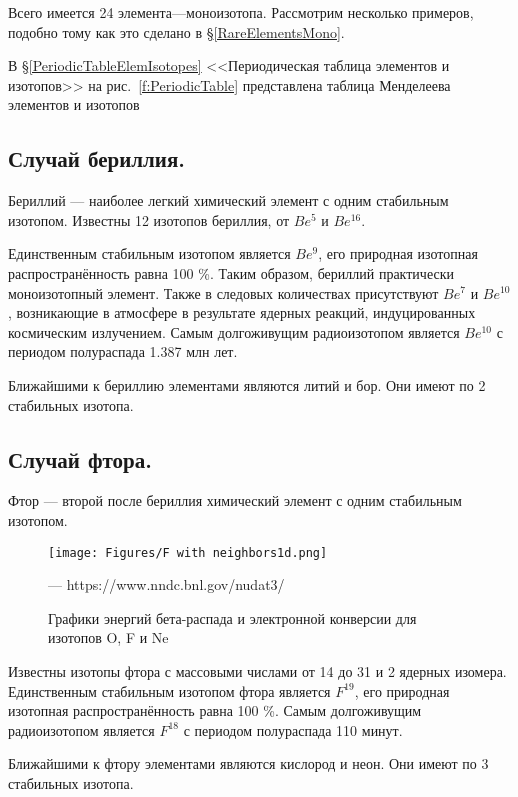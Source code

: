\documentclass[a5paper,openany]{book}
\begin{document}
Всего имеется 24 элемента---моноизотопа. Рассмотрим несколько примеров, подобно тому как это сделано в \S\ref{RareElementsMono}. 

В \S\ref{PeriodicTableElemIsotopes} <<Периодическая таблица элементов и изотопов>>
на рис.~\ref{f:PeriodicTable} представлена таблица Менделеева элементов и изотопов \cite{IUPAC}

\subsection{Случай бериллия.} \label{LiBeB}

Бериллий  ---  наиболее легкий химический элемент с одним стабильным изотопом.
Известны 12 изотопов бериллия, от $Be^5$ и $Be^{16}$.

Единственным стабильным изотопом является $Be^9$, его природная изотопная распространённость равна 100 \%. Таким образом, бериллий практически моноизотопный элемент. Также в следовых количествах присутствуют $Be^7$ и $Be^{10}$, возникающие в атмосфере в результате ядерных реакций, индуцированных космическим излучением. Самым долгоживущим радиоизотопом является $Be^{10}$ с периодом полураспада 1.387 млн лет.

Ближайшими к бериллию элементами являются литий и бор. Они имеют по 2 стабильных изотопа. 

\subsection{Случай фтора.} \label{OFNe}

Фтор  --- второй после бериллия химический элемент с одним стабильным изотопом.

\begin{figure}[ht] 
	\centering\small
	\unitlength=1mm
	\texttt{[image: Figures/F with neighbors1d.png]} 
	\caption{Графики энергий бета-распада и электронной конверсии для изотопов O, F и Ne} --- https://www.nndc.bnl.gov/nudat3/
	\label{f:F with neighbors}
\end{figure}

Известны изотопы фтора с массовыми числами от 14 до 31 и 2 ядерных изомера.
Единственным стабильным изотопом фтора является $F^{19}$, его природная изотопная распространённость равна 100 \%. Самым долгоживущим радиоизотопом является $F^{18}$ с периодом полураспада 110 минут.

Ближайшими к фтору элементами являются кислород и неон. Они имеют по 3 стабильных изотопа. 
\end{document}
